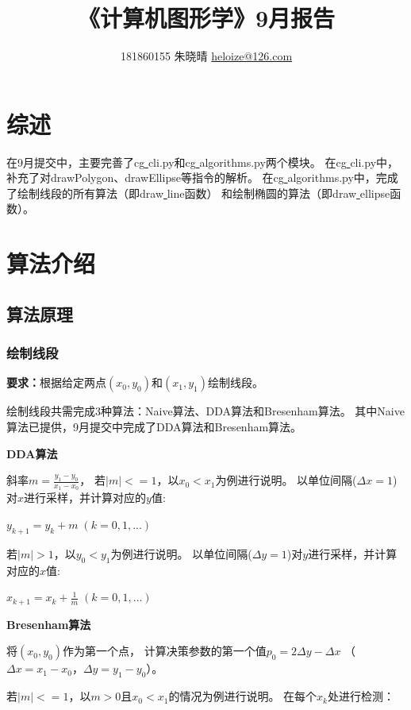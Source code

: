 \documentclass[a4paper,UTF8]{article}
\theoremstyle{definition}
\begin{document}
\title{\textbf{《计算机图形学》9月报告}}
\author{181860155 朱晓晴 \href{mailto:xxx@xxx.com}{heloize@126.com}}
\maketitle

\section{综述}
在9月提交中，主要完善了cg\underline{ }cli.py和cg\underline{ }algorithms.py两个模块。
在cg\underline{ }cli.py中，补充了对drawPolygon、drawEllipse等指令的解析。
在cg\underline{ }algorithms.py中，完成了绘制线段的所有算法（即draw\underline{ }line函数）
和绘制椭圆的算法（即draw\underline{ }ellipse函数）。


\section{算法介绍}
\subsection{算法原理}

\subsubsection{绘制线段}
\textbf{要求：}根据给定两点$(x_0,y_0)$和$(x_1,y_1)$绘制线段。

绘制线段共需完成3种算法：Naive算法、DDA算法和Bresenham算法。
其中Naive算法已提供，9月提交中完成了DDA算法和Bresenham算法。

\textbf{DDA算法} \cite{ref1}

斜率$m=\frac{y_1-y_0}{x_1-x_0}$，
若$|m|<=1$，以$x_0<x_1$为例进行说明。
以单位间隔($\Delta x=1$)对$x$进行采样，并计算对应的$y$值:

$y_{k+1}=y_k+m\;(k=0,1,...)$

若$|m|>1$，以$y_0<y_1$为例进行说明。
以单位间隔($\Delta y=1$)对$y$进行采样，并计算对应的$x$值:

$x_{k+1}=x_k+\frac{1}{m}\;(k=0,1,...)$

\textbf{Bresenham算法} \cite{ref1}

将$(x_0,y_0)$作为第一个点，
计算决策参数的第一个值$p_0=2\Delta y-\Delta x$
（$\Delta x=x_1-x_0$，$\Delta y=y_1-y_0$）。

若$|m|<=1$，以$m>0$且$x_0<x_1$的情况为例进行说明。
在每个$x_k$处进行检测：
\end{document}
